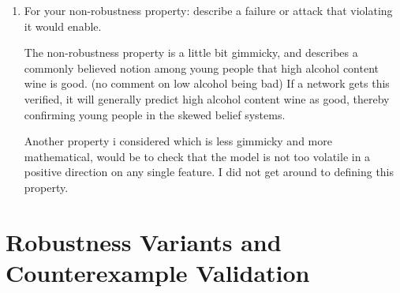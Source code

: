 \documentclass[11pt,a4paper]{article}
\begin{document}
\begin{enumerate}[leftmargin=*]
  \item For your non-robustness property: describe a failure or attack that violating it would enable.
  \begin{itshape}
  The non-robustness property is a little bit gimmicky, and describes a commonly believed notion
  among young people that high alcohol content wine is good. (no comment on low alcohol being bad)
  If a network gets this verified, it will generally predict high alcohol content wine as good,
  thereby confirming young people in the skewed belief systems.

  Another property i considered which is less gimmicky and more mathematical, would be to check
  that the model is not too volatile in a positive direction on any single feature. I did not
  get around to defining this property.
  \end{itshape}

\end{enumerate}

\section{Robustness Variants and Counterexample Validation}
\end{document}
